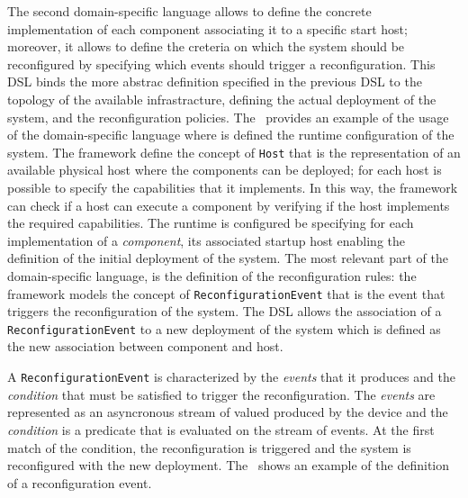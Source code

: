 \documentclass[conference]{IEEEtran}
\begin{document}
The second domain-specific language allows to define the concrete implementation of each component associating it to a specific start host;
moreover, it allows to define the creteria on which the system should be reconfigured by specifying which events should trigger a reconfiguration.
%
This DSL binds the more abstrac definition specified in the previous DSL to the topology of the available infrastracture,
defining the actual deployment of the system, and the reconfiguration policies.
%
The~ provides an example of the usage of the domain-specific language where is defined the runtime configuration of the system.
%
The framework define the concept of \texttt{Host} that is the representation of an available physical host where the components can be deployed;
for each host is possible to specify the capabilities that it implements.
%
In this way, the framework can check if a host can execute a component by verifying if the host implements the required capabilities.
%
The runtime is configured be specifying for each implementation of a \emph{component},
its associated startup host enabling the definition of the initial deployment of the system.
%
The most relevant part of the domain-specific language, is the definition of the reconfiguration rules:
the framework models the concept of \texttt{ReconfigurationEvent}
that is the event that triggers the reconfiguration of the system.
%
The DSL allows the association of a \texttt{ReconfigurationEvent}
to a new deployment of the system which is defined as the new association between component and host.



A \texttt{ReconfigurationEvent} is characterized by the \emph{events}
that it produces and the \emph{condition} that must be satisfied to trigger the reconfiguration.
%
The \emph{events} are represented as an asyncronous stream of valued produced by the device and the
\emph{condition} is a predicate that is evaluated on the stream of events.
%
At the first match of the condition, the reconfiguration is triggered and the system is reconfigured with the new deployment.
%
The~ shows an example of the definition of a reconfiguration event.
\end{document}
